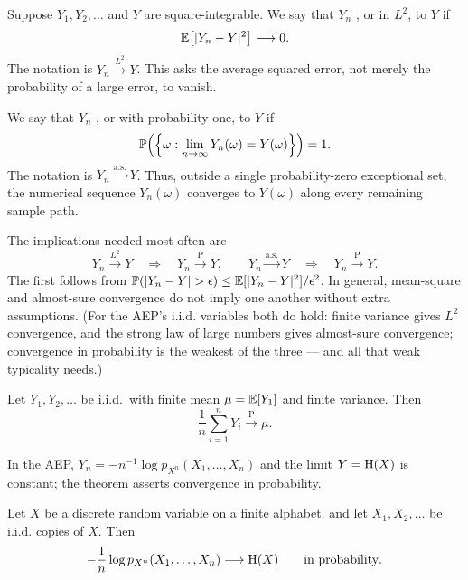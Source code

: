 \begin{definition}\label{def:mean-square-convergence}
Suppose $Y_1,Y_2,\ldots$ and $Y$ are square-integrable. We say that $Y_n$
, or in $L^2$, to $Y$ if
\[
  \mathbb{E}\!\left[|Y_n-Y|^2\right]\longrightarrow0.
\]
The notation is $Y_n\xrightarrow{L^2}Y$. This asks the average squared error,
not merely the probability of a large error, to vanish.
\end{definition}

\clearpage
\begin{definition}\label{def:almost-sure-convergence}
We say that $Y_n$ , or with probability one,
to $Y$ if
\[
  \mathbb{P}\!\left(\left\{\omega:
  \lim_{n\to\infty}Y_n(\omega)=Y(\omega)\right\}\right)=1.
\]
The notation is $Y_n\xrightarrow{\mathrm{a.s.}}Y$. Thus, outside a single
probability-zero exceptional set, the numerical sequence $Y_n(\omega)$
converges to $Y(\omega)$ along every remaining sample path.
\end{definition}

The implications needed most often are
\[
  Y_n\xrightarrow{L^2}Y
  \quad\Longrightarrow\quad
  Y_n\xrightarrow{\mathrm{P}}Y,
  \qquad
  Y_n\xrightarrow{\mathrm{a.s.}}Y
  \quad\Longrightarrow\quad
  Y_n\xrightarrow{\mathrm{P}}Y.
\]
The first follows from
$\PP(|Y_n-Y|>\epsilon)\le\E[|Y_n-Y|^2]/\epsilon^2$.
In general, mean-square and almost-sure convergence do not imply one another
without extra assumptions. (For the AEP's i.i.d. variables both do hold:
finite variance gives $L^2$ convergence, and the strong law of large numbers
gives almost-sure convergence; convergence in probability is the weakest of
the three --- and all that weak typicality needs.)


\begin{theorem}\label{thm:wlln}
Let $Y_1,Y_2,\ldots$ be i.i.d.\ with finite mean $\mu=\mathbb{E}[Y_1]$ and finite
variance. Then
\[
  \frac1n\sum_{i=1}^n Y_i\xrightarrow{\mathrm{P}}\mu.
\]
\end{theorem}

In the AEP, $Y_n=-n^{-1}\log p_{X^n}(X_1,\ldots,X_n)$ and the limit
$Y=\mathrm{H}(X)$ is constant; the theorem asserts convergence in probability.

\begin{theorem}\label{thm:weak-aep}
Let $X$ be a discrete random variable on a finite alphabet, and let
$X_1,X_2,\ldots$ be i.i.d. copies of $X$. Then
\[
  -\frac1n\log p_{X^n}(X_1,\ldots,X_n)
  \longrightarrow \mathrm{H}(X)
  \qquad\text{in probability}.
\]
\end{theorem}


